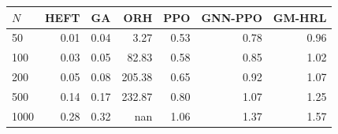 \begin{tabular}{lrrrrrr}
\toprule
$N$ & HEFT & GA & ORH & PPO & GNN-PPO & GM-HRL \\
\midrule
50 & 0.01 & 0.04 & 3.27 & 0.53 & 0.78 & 0.96 \\
100 & 0.03 & 0.05 & 82.83 & 0.58 & 0.85 & 1.02 \\
200 & 0.05 & 0.08 & 205.38 & 0.65 & 0.92 & 1.07 \\
500 & 0.14 & 0.17 & 232.87 & 0.80 & 1.07 & 1.25 \\
1000 & 0.28 & 0.32 & nan & 1.06 & 1.37 & 1.57 \\
\bottomrule
\end{tabular}
